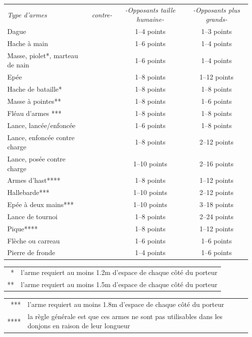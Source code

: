 \documentclass[11pt]{article}
\begin{document}
{\begin{tabular}{lccc}
\textit{Type d'armes} & \textit{contre-} & \textit{-Opposants taille humaine-} & \textit{-Opposants plus grands-} \\
Dague                          && 1--4 points  & 1--3 points \\
Hache à main                   && 1--6 points  & 1--4 points \\
Masse, piolet*, marteau de nain && 1--6 points  & 1--4 points \\
Epée                           && 1--8 points  & 1--12 points \\
Hache de bataille*             && 1--8 points  & 1--8 points \\
Masse à pointes**              && 1--8 points  & 1--6 points \\
Fléau d'armes ***              && 1--8 points  & 1--8 points \\
Lance, lancée/enfoncée         && 1--6 points  & 1--8 points \\
Lance, enfoncée contre charge  && 1--8 points  & 2--12 points \\
Lance, posée contre charge     && 1--10 points & 2--16 points \\
Armes d'hast****               && 1--8 points  & 1--12 points \\
Hallebarde***                  && 1--10 points & 2--12 points \\
Epée à deux mains***           && 1--10 points & 3--18 points \\
Lance de tournoi               && 1--8 points  & 2--24 points \\
Pique****                      && 1--8 points  & 1--12 points \\
Flèche ou carreau              && 1--6 points  & 1--6 points \\
Pierre de fronde               && 1--4 points  & 1--6 points \\
\end{tabular}

\begin{tabular}{rp{15cm}}
\multicolumn{1}{r}{*} & l'arme requiert au moins 1.2m d'espace de chaque côté du porteur \\
\multicolumn{1}{r}{**} & l'arme requiert au moins 1.5m d'espace de chaque côté du porteur \\
\end{tabular}

\begin{tabular}{rp{15cm}}
\multicolumn{1}{r}{***} & l'arme requiert au moins 1.8m d'espace de chaque côté du porteur \\
\multicolumn{1}{r}{****} & la règle générale est que ces armes ne sont pas utilisables dans les donjons en raison de leur longueur \\
\end{tabular}

}
\end{document}
